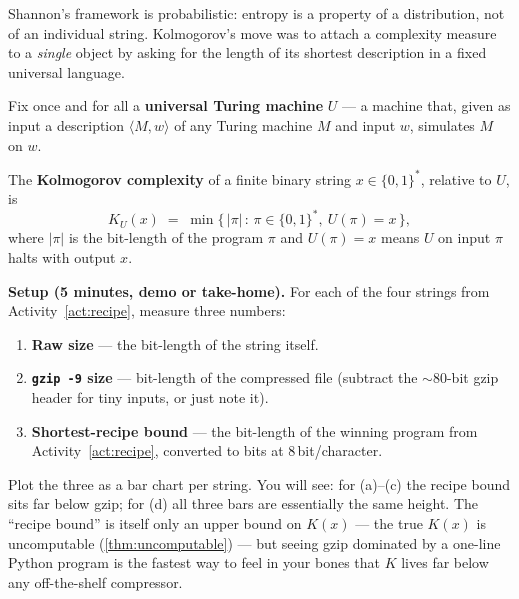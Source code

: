 Shannon's framework is probabilistic: entropy is a property of a
distribution, not of an individual string.  Kolmogorov's move
\citep{kolmogorov1965three} was to attach a complexity measure to a
\emph{single} object by asking for the length of its shortest
description in a fixed universal language.

Fix once and for all a \textbf{universal Turing machine} $U$ --- a
machine that, given as input a description $\langle M, w\rangle$ of
any Turing machine $M$ and input $w$, simulates $M$ on $w$.

\begin{definition}
\label{def:kolmogorov}
The \textbf{Kolmogorov complexity} of a finite binary string
$x \in \{0,1\}^*$, relative to $U$, is
\begin{equation}
  K_U(x)
  \;=\; \min\bigl\{\, |\pi| \,:\, \pi \in \{0,1\}^*,\ U(\pi) = x \,\bigr\},
  \label{eq:kolmogorov}
\end{equation}
where $|\pi|$ is the bit-length of the program $\pi$ and $U(\pi) = x$
means $U$ on input $\pi$ halts with output $x$.
\end{definition}

\begin{activity}[title={Activity 2 --- The gzip-vs-$K$ scoreboard}]
\label{act:scoreboard}
\textbf{Setup (5 minutes, demo or take-home).}  For each of the four
strings from Activity~\ref{act:recipe}, measure three numbers:

\begin{enumerate}[label=(\roman*),leftmargin=*]
  \item \textbf{Raw size} --- the bit-length of the string itself.
  \item \textbf{\texttt{gzip -9} size} --- bit-length of the
        compressed file (subtract the $\sim\!80$-bit gzip header for
        tiny inputs, or just note it).
  \item \textbf{Shortest-recipe bound} --- the bit-length of the
        winning program from Activity~\ref{act:recipe}, converted to
        bits at $8$\,bit/character.
\end{enumerate}

Plot the three as a bar chart per string.  You will see: for (a)--(c)
the recipe bound sits far below gzip; for (d) all three bars are
essentially the same height.  The ``recipe bound'' is itself only an
upper bound on $K(x)$ --- the true $K(x)$ is uncomputable
(\cref{thm:uncomputable}) --- but seeing gzip dominated by a
one-line Python program is the fastest way to feel in your bones that
$K$ lives far below any off-the-shelf compressor.
\end{activity}

